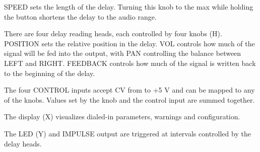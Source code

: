 \documentclass[11pt]{article}
\begin{document}
\begin{minipage}[t]{0.55\textwidth}
SPEED sets the length of the delay. Turning this knob to the max while holding the button shortens the delay to the audio range.

There are four delay reading heads, each controlled by four knobs (H). POSITION sets the relative position in the delay. VOL controls how much of the signal will be fed into the output, with PAN controlling the balance between LEFT and RIGHT. FEEDBACK controls how much of the signal is written back to the beginning of the delay.

The four CONTROL inputs accept CV from  to +5 V and can be mapped to any of the knobs. Values set by the knob and the control input are summed together.

The display (X) visualizes dialed-in parameters, warnings and configuration.

The LED (Y) and IMPULSE output are triggered at intervals controlled by the delay heads.

\end{minipage}%
\begin{minipage}{0.05\textwidth}
\phantom{ }
\end{minipage}%
\end{document}

